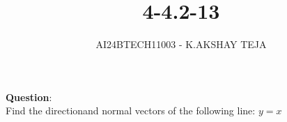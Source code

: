 \documentclass[journal]{IEEEtran}
\begin{document}

\vspace{3cm}

\title{4-4.2-13}
\author{AI24BTECH11003 - K.AKSHAY TEJA}
{\let\newpage\relax\maketitle}

\renewcommand{\thefigure}{\theenumi}
\renewcommand{\thetable}{\theenumi}
\setlength{\intextsep}{10pt} %


\renewcommand{\thetable}{\theenumi}


\textbf{Question}:\\
Find the directionand normal vectors of the following line: $y=x$

\solution
\begin{table}[h!]
	\centering
	
	\caption{}
	\label{tab:4-4.2-13}
\end{table}
\end{document}
